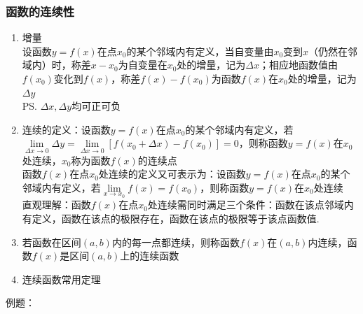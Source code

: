 \subsubsection*{函数的连续性}
\begin{enumerate}
    \item 增量 \\
    设函数$y = f(x)$在点$x_0$的某个邻域内有定义，当自变量由$x_0$变到$x$（仍然在邻域内）时，称差$x - x_0$为自变量在$x_0$处的增量，记为$\Delta x$；相应地函数值由$f(x_0)$变化到$f(x)$，称差$f(x) - f(x_0)$为函数$f(x)$在$x_0$处的增量，记为$\Delta y$ \\
    \ps $\Delta x, \Delta y$均可正可负 
    \item 连续的定义：设函数$y = f(x)$在点$x_0$的某个邻域内有定义，若$\lim\limits_{\Delta x \rightarrow 0} \Delta y = \lim\limits_{\Delta x \rightarrow 0} [f(x_0+\Delta x) - f(x_0)]= 0$，则称函数$y = f(x)$在$x_0$处连续，$x_0$称为函数$f(x)$的连续点 \\
    函数$f(x)$在点$x_0$处连续的定义又可表示为：设函数$y = f(x)$在点$x_0$的某个邻域内有定义，若$\lim\limits_{x \to x_0} f(x) = f(x_0)$，则称函数$y = f(x)$在$x_0$处连续 \\
    直观理解：函数$f(x)$在点$x_0$处连续需同时满足三个条件：函数在该点邻域内有定义，函数在该点的极限存在，函数在该点的极限等于该点函数值.
    \item 若函数在区间$(a, b)$内的每一点都连续，则称函数$f(x)$在$(a, b)$内连续，函数$f(x)$是区间$(a, b)$上的连续函数
    \item 连续函数常用定理
\end{enumerate}
例题：
